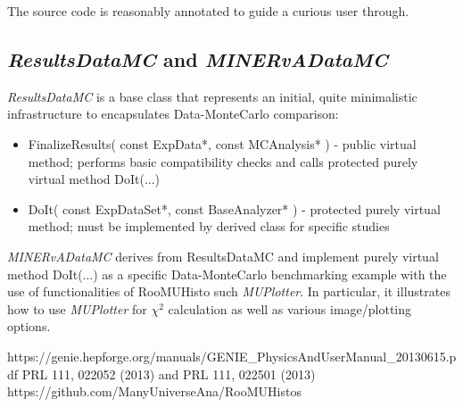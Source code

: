 The source code is reasonably annotated to guide a curious user through.

\subsection{ {\it ResultsDataMC} and {\it MINERvADataMC} }

{\it ResultsDataMC} is a base class that represents an initial, quite minimalistic infrastructure to encapsulates 
Data-MonteCarlo comparison:
\begin{itemize}
\item{  FinalizeResults( const ExpData*, const MCAnalysis* ) - public virtual method; performs basic compatibility 
checks and calls protected purely virtual method DoIt(...)}
\item{ DoIt( const ExpDataSet*, const BaseAnalyzer* ) - protected purely virtual method; must be implemented by derived
class for specific studies}
\end{itemize}

{\it MINERvADataMC} derives from ResultsDataMC and implement purely virtual method DoIt(...) as a specific Data-MonteCarlo
benchmarking example with the use of functionalities of RooMUHisto such {\it MUPlotter}. In particular, it illustrates how
to use {\it MUPlotter} for $\chi^{2}$ calculation as well as various image/plotting options. 


\begin{thebibliography}{99}
 https://genie.hepforge.org/manuals/GENIE\_PhysicsAndUserManual\_20130615.pdf
 PRL 111, 022052 (2013) and PRL 111, 022501 (2013)
 https://github.com/ManyUniverseAna/RooMUHistos
\end{thebibliography}


